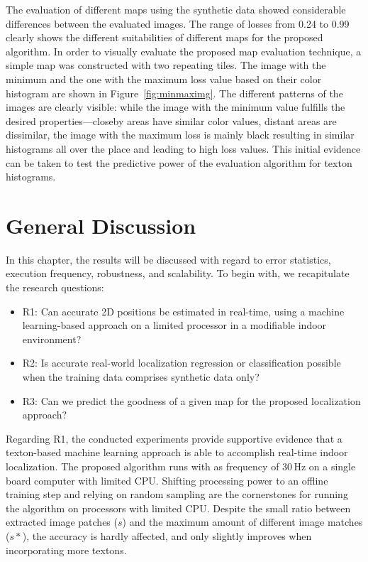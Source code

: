 \documentclass{report}
\begin{document}
The evaluation of different maps using the synthetic data showed
considerable differences between the evaluated images. The range of
losses from 0.24 to 0.99 clearly shows the different suitabilities of
different maps for the proposed algorithm. In order to visually
evaluate the proposed map evaluation technique, a simple map was
constructed with two repeating tiles. The image with the minimum and
the one with the maximum loss value based on their color histogram are
shown in Figure~\ref{fig:minmaximg}. The different patterns of the
images are clearly visible: while the image with the minimum value
fulfills the desired properties---closeby areas have similar color
values, distant areas are dissimilar, the image with the maximum loss
is mainly black resulting in similar histograms all over the place and
leading to high loss values. This initial evidence can be taken to
test the predictive power of the evaluation algorithm for texton
histograms.

\section{General Discussion}
\label{sec:generaldiscussion}

In this chapter, the results will be discussed with regard to error
statistics, execution frequency, robustness, and scalability. To begin
with, we recapitulate the research questions:

\begin{itemize}
\item R1: Can accurate 2D positions be estimated in real-time, using a
  machine learning-based approach on a limited processor in a
  modifiable indoor environment?
\item R2: Is accurate real-world localization regression or classification
  possible when the training data comprises synthetic data only?
\item R3: Can we predict the goodness of a given map for the proposed
  localization approach?
\end{itemize}

Regarding R1, the conducted experiments provide supportive evidence
that a texton-based machine learning approach is able to accomplish
real-time indoor localization. The proposed algorithm runs with as
frequency of 30\,Hz on a single board computer with limited
CPU. Shifting processing power to an offline training step and relying
on random sampling are the cornerstones for running the algorithm on
processors with limited CPU. Despite the small ratio between extracted
image patches ($s$) and the maximum amount of different image matches
($s*$), the accuracy is hardly affected, and only slightly improves
when incorporating more textons.
\end{document}
